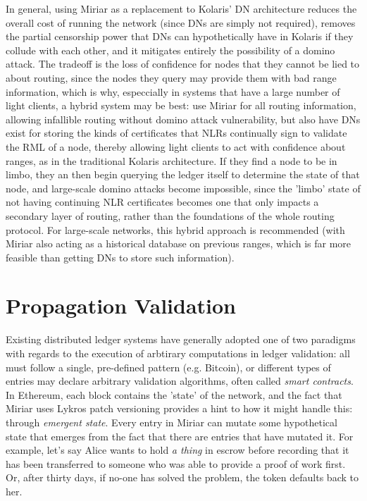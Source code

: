 \documentclass{extreport}
\begin{document}
In general, using Miriar as a replacement to Kolaris' DN architecture reduces the overall cost of running the network (since DNs are simply not required), removes the partial censorship power that DNs can hypothetically have in Kolaris if they collude with each other, and it mitigates entirely the possibility of a domino attack. The tradeoff is the loss of confidence for nodes that they cannot be lied to about routing, since the nodes they query may provide them with bad range information, which is why, especcially in systems that have a large number of light clients, a hybrid system may be best: use Miriar for all routing information, allowing infallible routing without domino attack vulnerability, but also have DNs exist for storing the kinds of certificates that NLRs continually sign to validate the RML of a node, thereby allowing light clients to act with confidence about ranges, as in the traditional Kolaris architecture. If they find a node to be in limbo, they an then begin querying the ledger itself to determine the state of that node, and large-scale domino attacks become impossible, since the 'limbo' state of not having continuing NLR certificates becomes one that only impacts a secondary layer of routing, rather than the foundations of the whole routing protocol. For large-scale networks, this hybrid approach is recommended (with Miriar also acting as a historical database on previous ranges, which is far more feasible than getting DNs to store such information).

\chapter{Propagation Validation}
\label{sec:org8c98352}

Existing distributed ledger systems have generally adopted one of two paradigms with regards to the execution of arbtirary computations in ledger validation: all must follow a single, pre-defined pattern (e.g. Bitcoin), or different types of entries may declare arbitrary validation algorithms, often called \emph{smart contracts}. In Ethereum, each block contains the 'state' of the network, and the fact that Miriar uses Lykros patch versioning provides a hint to how it might handle this: through \emph{emergent state}. Every entry in Miriar can mutate some hypothetical state that emerges from the fact that there are entries that have mutated it. For example, let's say Alice wants to hold \emph{a thing} in escrow before recording that it has been transferred to someone who was able to provide a proof of work first. Or, after thirty days, if no-one has solved the problem, the token defaults back to her.
\end{document}
